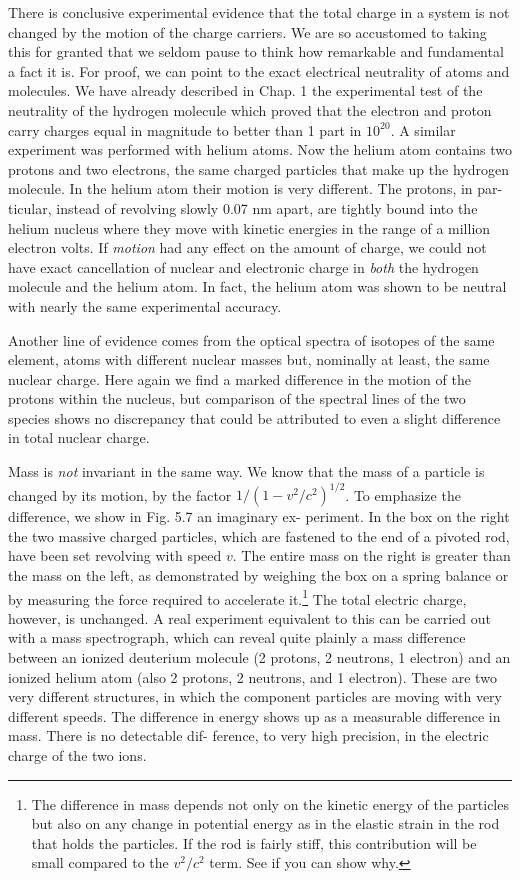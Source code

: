 There is conclusive experimental evidence that the total charge in
a system is not changed by the motion of the charge carriers. We
are so accustomed to taking this for granted that we seldom pause
to think how remarkable and fundamental a fact it is. For proof,
we can point to the exact electrical neutrality of atoms and molecules.
We have already described in Chap. 1 the experimental test of the
neutrality of the hydrogen molecule which proved that the electron
and proton carry charges equal in magnitude to better than 1 part
in $10^{20}$. A similar experiment was performed with helium atoms.
Now the helium atom contains two protons and two electrons, the
same charged particles that make up the hydrogen molecule. In the
helium atom their motion is very different. The protons, in par-
ticular, instead of revolving slowly 0.07 nm apart, are tightly
bound into the helium nucleus where they move with kinetic energies
in the range of a million electron volts. If \emph{motion} had any effect on
the amount of charge, we could not have exact cancellation of nuclear
and electronic charge in \emph{both} the hydrogen molecule and the helium
atom. In fact, the helium atom was shown to be neutral with nearly
the same experimental accuracy.

Another line of evidence comes from the optical spectra of isotopes
of the same element, atoms with different nuclear masses but,
nominally at least, the same nuclear charge. Here again we find a
marked difference in the motion of the protons within the nucleus,
but comparison of the spectral lines of the two species shows no discrepancy
that could be attributed to even a slight difference in total
nuclear charge.

Mass is \emph{not} invariant in the same way. We know that the mass of
a particle is changed by its motion, by the factor $1/(1-v^2/c^2)^{1/2}$.
To emphasize the difference, we show in Fig. 5.7 an imaginary ex-
periment. In the box on the right the two massive charged particles,
which are fastened to the end of a pivoted rod, have been set revolving
with speed $v$. The entire mass on the right is greater than the
mass on the left, as demonstrated by weighing the box on a spring
balance or by measuring the force required to 
accelerate it.\footnote{The difference in mass depends not only on the kinetic energy of the particles but
also on any change in potential energy as in the elastic strain in the rod that holds the
particles. If the rod is fairly stiff, this contribution will be small compared to the $v^2/c^2$
term. See if you can show why.} The
total electric charge, however, is unchanged. A real experiment
equivalent to this can be carried out with a mass spectrograph, which
can reveal quite plainly a mass difference between an ionized deuterium
molecule (2 protons, 2 neutrons, 1 electron) and an ionized
helium atom (also 2 protons, 2 neutrons, and 1 electron). These are
two very different structures, in which the component particles are
moving with very different speeds. The difference in energy shows
up as a measurable difference in mass. There is no detectable dif-
ference, to very high precision, in the electric charge of the two ions.

